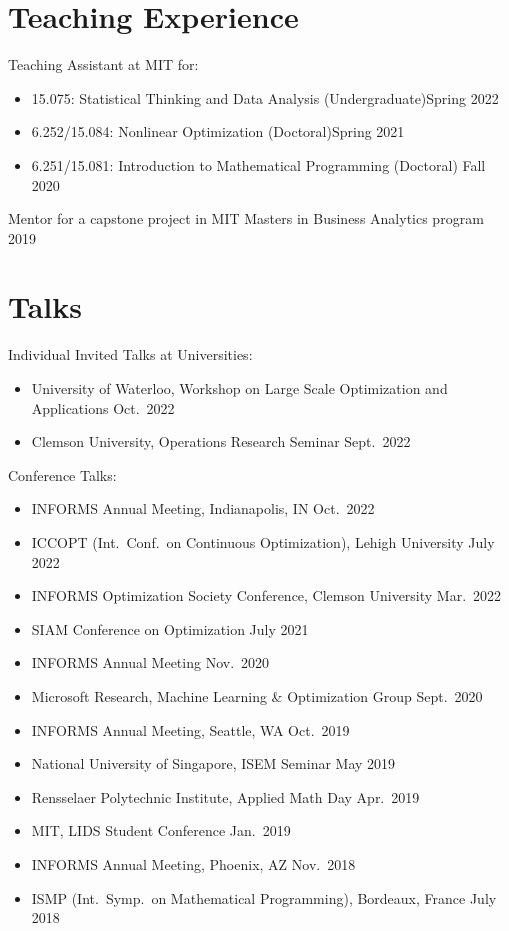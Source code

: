 \documentclass[11pt]{article}
\begin{document}
\section*{\large Teaching Experience}

\noindent Teaching Assistant at MIT for:
\begin{itemize}\setlength{\leftskip}{3ex}
\item  15.075: Statistical Thinking and Data Analysis (Undergraduate)\hfill Spring 2022
\item  6.252/15.084: Nonlinear Optimization (Doctoral)\hfill Spring 2021
\item 6.251/15.081: Introduction to Mathematical Programming (Doctoral) \hfill Fall 2020
\end{itemize}

\noindent Mentor for a capstone project in MIT Masters in Business Analytics program \hfill 2019

\section*{\large Talks} %

{\noindent  Individual Invited Talks at Universities:
\begin{itemize}
\item University of Waterloo, Workshop on Large Scale Optimization and Applications \hfill  Oct.\ 2022
\item Clemson University, Operations Research Seminar \hfill Sept.\ 2022
\end{itemize}
}

{\noindent Conference Talks:}
\begin{itemize}
\item INFORMS Annual Meeting, Indianapolis, IN \hfill Oct.\ 2022
\item ICCOPT (Int.\ Conf.\ on Continuous Optimization), Lehigh University  \hfill July 2022
\item INFORMS Optimization Society Conference, Clemson University \hfill Mar.\ 2022
\item SIAM Conference on Optimization \hfill July 2021
\item INFORMS Annual Meeting \hfill Nov.\ 2020 
\item Microsoft Research, Machine Learning \& Optimization Group \hfill Sept.\ 2020
\item INFORMS Annual Meeting, Seattle, WA \hfill Oct.\ 2019
\item National University of Singapore, ISEM Seminar \hfill  May 2019
\item Rensselaer Polytechnic Institute, Applied Math Day \hfill Apr.\ 2019
\item MIT, LIDS Student Conference \hfill Jan.\ 2019
\item INFORMS Annual Meeting, Phoenix, AZ \hfill  Nov.\ 2018
\item {ISMP (Int.\ Symp.\ on Mathematical Programming)}, Bordeaux, France \hfill July 2018
\end{itemize}
\end{document}
